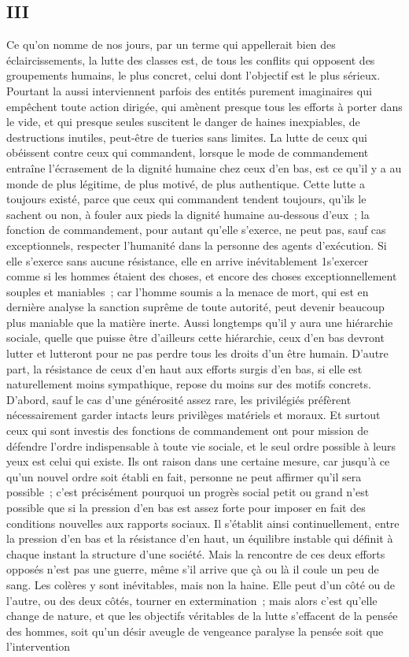 \documentclass[french,twoside]{book} %
\begin{document}
\subsection[III]{III}
\noindent Ce qu'on nomme de nos jours, par un terme qui appellerait bien des éclaircissements, la lutte des classes est, de tous les conflits qui opposent des groupements humains, le plus concret, celui dont l'objectif est le plus sérieux. Pourtant la aussi interviennent parfois des entités purement imaginaires qui empêchent toute action dirigée, qui amènent presque tous les efforts à porter dans le vide, et qui presque seules suscitent le danger de haines inexpiables, de destructions inutiles, peut-être de tueries sans limites. La lutte de ceux qui obéissent contre ceux qui commandent, lorsque le mode de commandement entraîne l'écrasement de la dignité humaine chez ceux d'en bas, est ce qu'il y a au monde de plus légitime, de plus motivé, de plus authentique. Cette lutte a toujours existé, parce que ceux qui commandent tendent toujours, qu'ils le sachent ou non, à fouler aux pieds la dignité humaine au-dessous d'eux ; la fonction de commandement, pour autant qu’elle s'exerce, ne peut pas, sauf cas exceptionnels, respecter l'humanité dans la personne des agents d'exécution. Si elle s'exerce sans aucune résistance, elle en arrive inévitablement 1s'exercer comme si les hommes étaient des choses, et encore des choses exceptionnellement souples et maniables ; car l'homme soumis a la menace de mort, qui est en dernière analyse la sanction suprême de toute autorité, peut devenir beaucoup plus maniable que la matière inerte. Aussi longtemps qu'il y aura une hiérarchie sociale, quelle que puisse être d'ailleurs cette hiérarchie, ceux d'en bas devront lutter et lutteront pour ne pas perdre tous les droits d'un être humain. D'autre part, la résistance de ceux d'en haut aux efforts surgis d'en bas, si elle est naturellement moins sympathique, repose du moins sur des motifs concrets. D'abord, sauf le cas d'une générosité assez rare, les privilégiés préfèrent nécessairement garder intacts leurs privilèges matériels et moraux. Et surtout ceux qui sont investis des fonctions de commandement ont pour mission de défendre l'ordre indispensable à toute vie sociale, et le seul ordre possible à leurs yeux est celui qui existe. Ils ont raison dans une certaine mesure, car jusqu'à ce qu'un nouvel ordre soit établi en fait, personne ne peut affirmer qu'il sera possible ; c'est précisément pourquoi un progrès social petit ou grand n'est possible que si la pression d'en bas est assez forte pour imposer en fait des conditions nouvelles aux rapports sociaux. Il s'établit ainsi continuellement, entre la pression d'en bas et la résistance d'en haut, un équilibre instable qui définit à chaque instant la structure d'une société. Mais la rencontre de ces deux efforts opposés n'est pas une guerre, même s'il arrive que çà ou là il coule un peu de sang. Les colères y sont inévitables, mais non la haine. Elle peut d'un côté ou de l'autre, ou des deux côtés, tourner en extermination ; mais alors c'est qu'elle change de nature, et que les objectifs véritables de la lutte s'effacent de la pensée des hommes, soit qu’un désir aveugle de vengeance paralyse la pensée soit que l'intervention 
\end{document}

